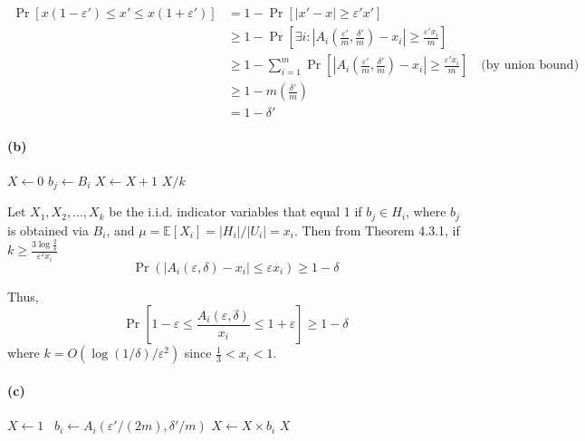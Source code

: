 \documentclass[11pt]{article} %
\begin{document}
\begin{equation}
\begin{aligned}
    \Pr \left[x(1-\varepsilon') \leq x' \leq x(1+\varepsilon')\right]
    &= 1 - \Pr \left[|x'-x|\geq \varepsilon'x'\right] \\
    &\geq 1 - \Pr \left[\exists i : 
    \left|A_i\left(\frac{\varepsilon'}{m},\frac{\delta'}{m}\right) - x_i \right| \geq \frac{\varepsilon'x_i}{m}\right] \\
    &\geq 1 - \sum_{i=1}^m \Pr \left[ 
    \left|A_i\left(\frac{\varepsilon'}{m},\frac{\delta'}{m}\right) - x_i \right| \geq \frac{\varepsilon'x_i}{m}\right] 
    \quad\text{(by union bound)}\\
    &\geq 1 - m\left(\frac{\delta'}{m}\right)\\
    &= 1-\delta'
\end{aligned}
\end{equation}

\paragraph{(b)}

\begin{algorithm}
\caption{$A_i(\varepsilon,\delta)$}\label{alg:cap}
\begin{algorithmic}
\State $X \gets 0$
\State $b_j \gets B_i$
\State $X \gets X+1$
\EndIf
\EndFor
\State \Return $X/k$
\end{algorithmic}
\end{algorithm}

Let $X_1,X_2,...,X_k$ be the i.i.d. indicator variables that equal 1 if $b_j \in H_i$, 
where $b_j$ is obtained via $B_i$, and $\mu = \mathbb{E}[X_i] = |H_i|/|U_i| = x_i$.
Then from Theorem 4.3.1, if $k\geq \frac{3\log\frac{2}{\delta}}{\varepsilon^2 x_i}$
\[\Pr (|A_i(\varepsilon,\delta) - x_i| \leq \varepsilon x_i ) \geq 1-\delta\]

Thus,
\[\Pr \left[1-\varepsilon \leq \frac{A_i(\varepsilon,\delta)}{x_i} \leq 1+\varepsilon\right] \geq 1-\delta\]
where $k=O(\log(1/\delta)/\varepsilon^2)$ since $\frac{1}{3}<x_i<1$.

\clearpage
\paragraph{(c)}

\begin{algorithm}
\caption{$A'(\varepsilon',\delta')$}\label{alg:cap}
\begin{algorithmic}
\State $X \gets 1$\
\State $b_i \gets A_i(\varepsilon'/(2m), \delta'/m)$
\State $X \gets X \times b_i$
\EndFor
\State \Return $X$
\end{algorithmic}
\end{algorithm}
\end{document}
